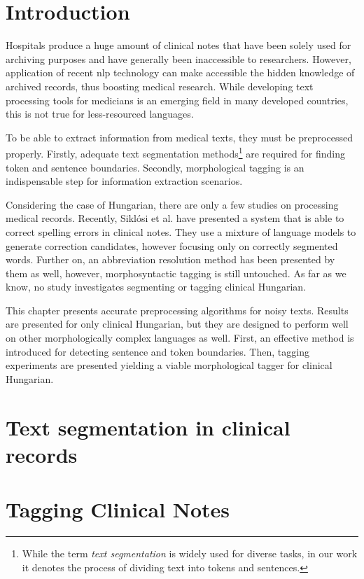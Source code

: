 
\section{Introduction}

Hospitals produce a huge amount of clinical notes that have been solely used for archiving purposes and have generally been inaccessible to researchers. 
However, application of recent \acrshort{nlp} technology can make accessible the hidden knowledge of archived records, thus boosting medical research. 
While developing text processing tools for medicians is an emerging field in many developed countries, this is not true for less-resourced languages.

To be able to extract information from medical texts, they must be preprocessed properly. 
Firstly, adequate text segmentation methods\footnote{While the term \emph{text segmentation} is widely used for diverse tasks, in our work it denotes the process of dividing text into tokens and sentences.} 
are required for finding token and sentence boundaries. 
Secondly, morphological tagging is an indispensable step for information extraction scenarios. 

Considering the case of Hungarian, there are only a few studies on processing medical records. 
Recently, Siklósi et al. \cite{Siklosi2012,Siklosi2013} have presented a system that is able to correct spelling errors in clinical notes. 
They use a mixture of language models to generate correction candidates, however focusing only on correctly segmented words. 
Further on, an abbreviation resolution method has been presented by them \cite{Siklosi2013b} as well, however, morphosyntactic tagging is still untouched. 
As far as we know, no study investigates segmenting or tagging clinical Hungarian. 

This chapter presents accurate preprocessing algorithms for noisy texts.
Results are presented for only clinical Hungarian, but they are designed to perform well on other morphologically complex languages as well. 
First, an effective method is introduced for detecting sentence and token boundaries.
Then, tagging experiments are presented yielding a viable morphological tagger for clinical Hungarian. 


\section{Text segmentation in clinical records}


\pagebreak

\section{Tagging Clinical Notes}


